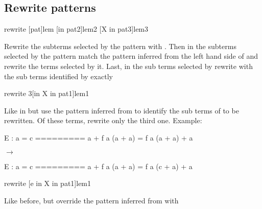 \begin{landscape}
\begin{small}
\begin{multicols*}{3}[\begin{center}\section*{}\end{center}]
% 
% 


\subsection*{Rewrite patterns}

\begin{cheat}
rewrite [pat]lem [in pat2]lem2 [X in pat3]lem3
\end{cheat}
  Rewrite the subterms selected by the pattern  with .
  Then in the subterms selected by the pattern 
  match the pattern inferred from the left hand side of  and
  rewrite the terms selected by it. Last, in the sub terms selected by
   rewrite with  the sub terms identified by  exactly

\begin{cheat}
rewrite {3}[in X in pat1]lem1
\end{cheat}
  Like in  but use the pattern
  inferred from  to identify the sub terms of  to be
  rewritten. Of these terms, rewrite only the third one. Example:

\begin{cheatout}
E : a = c
=========
a + f a (a + a) =
  f a (a + a) + a
\end{cheatout}
$\to$
\begin{cheatout}
E : a = c
=========
a + f a (a + a) =
  f a (c + a) + a
\end{cheatout}



\begin{cheat}
rewrite [e in X in pat1]lem1
\end{cheat}
  Like before, but override the pattern inferred from  with


\end{multicols*}
\end{small}
\end{landscape}
